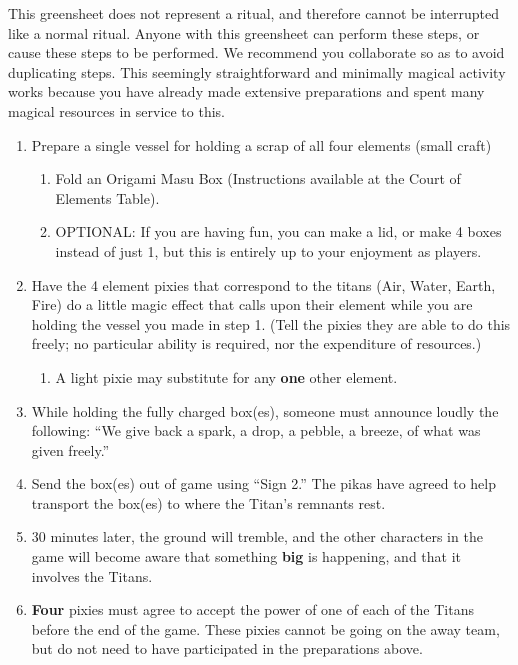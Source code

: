 \documentclass[green]{PP}
\begin{document}
\name{\gTitan{}}

This greensheet does not represent a ritual, and therefore cannot be interrupted like a normal ritual. Anyone with this greensheet can perform these steps, or cause these steps to be performed. We recommend you collaborate so as to avoid duplicating steps. This seemingly straightforward and minimally magical activity works because you have already made extensive preparations and spent many magical resources in service to this.

\begin{enumerate}
	\item Prepare a single vessel for holding a scrap of all four elements (small craft)
	\begin{enumerate}
		\item Fold an Origami Masu Box (Instructions available at the Court of Elements Table).
		\item OPTIONAL: If you are having fun, you can make a lid, or make 4 boxes instead of just 1, but this is entirely up to your enjoyment as players.
	\end{enumerate}
	\item Have the 4 element pixies that correspond to the titans (Air, Water, Earth, Fire) do a little magic effect that calls upon their element while you are holding the vessel you made in step 1. (Tell the pixies they are able to do this freely; no particular ability is required, nor the expenditure of resources.)
	\begin{enumerate}
		\item A light pixie may substitute for any \textbf{one} other element.
	\end{enumerate}
	\item While holding the fully charged box(es), someone must announce loudly the following: “We give back a spark, a drop, a pebble, a breeze, of what was given freely.”
	\item Send the box(es) out of game using “Sign 2.” The pikas have agreed to help transport the box(es) to where the Titan’s remnants rest.
	\item 30 minutes later, the ground will tremble, and the other characters in the game will become aware that something \textbf{big} is happening, and that it involves the Titans.
	\item \textbf{Four} pixies must agree to accept the power of one of each of the Titans before the end of the game. These pixies cannot be going on the away team, but do not need to have participated in the preparations above.

\end{enumerate}
\end{document}
